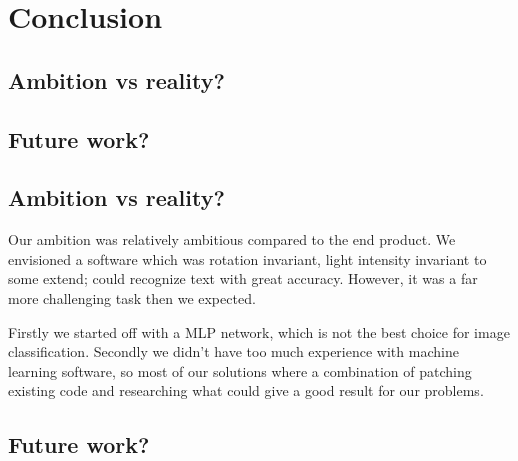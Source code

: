 \documentclass[Report.tex]{subfiles}
\begin{document}
\chapter{Conclusion}
\label{sec:Conclusion}
\section{Ambition vs reality?}
\section{Future work?}


\section{Ambition vs reality?}
Our ambition was relatively ambitious compared to the end product. We envisioned
a software which was rotation invariant, light intensity invariant to some
extend; could recognize text with great accuracy. However, it was a far more
challenging task then we expected. \par
Firstly we started off with a MLP network, which is not the best choice for
image classification. Secondly we didn't have too much experience with
machine learning software, so most of our solutions where a combination of
patching existing code and researching what could give a good result for
our problems.


\section{Future work?}
\end{document}

